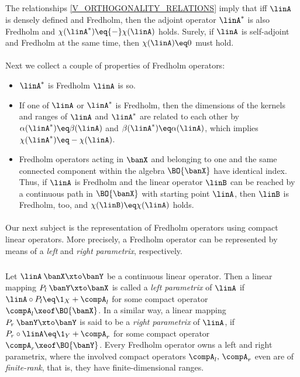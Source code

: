 \documentclass[11pt,twoside]{article}
\begin{document}
\subparagraph{} %
The relationships \eqref{V_ORTHOGONALITY_RELATIONS} imply
that iff $\linA$ is densely defined and Fredholm,
then the adjoint operator $\linA^*$ is also Fredholm and
$\chi(\linA^*) \eq {-} \chi(\linA)$ holds.
Surely,
if $\linA$ is self-adjoint and Fredholm at the same time,
then $\chi(\linA) \eq 0$ must hold.

\paragraph{} %
Next we collect a couple of properties of Fredholm operators:

\begin{itemize}[leftmargin=4mm]
\item[1.]
$\linA^*$ is Fredholm \iff $\linA$ is so.

\item[2.]
If one of $\linA$ or $\linA^*$ is Fredholm,
then the dimensions of the kernels and ranges of $\linA$ and $\linA^*$
are related to each other by
$\alpha(\linA^*) \eq \beta(\linA)$ and
$\beta(\linA^*) \eq \alpha(\linA)$,
which implies $\chi(\linA^*) \eq - \chi(\linA)$.

\item[3.]
Fredholm operators acting in $\banX$ and
belonging to one and the same connected component
within the algebra $\BO{\banX}$ have identical index.
Thus,
if $\linA$ is Fredholm and the linear operator $\linB$ can be reached
by a continuous path in $\BO{\banX}$ with starting point $\linA$,
then $\linB$ is Fredholm,
too,
and $\chi(\linB) \eq \chi(\linA)$ holds.
\end{itemize}

\paragraph{} %
Our next subject is the representation of Fredholm operators
using compact linear operators.
More precisely,
a Fredholm operator can be represented by means of
a \textit{left} and \textit{right parametrix},
respectively.

\subparagraph{}
Let $\linA\:\banX \xto \banY$ be a continuous linear operator.
Then a linear mapping $P_l\:\banY \xto \banX$
is called a \textit{left parametrix} of $\linA$
if $\linA \circ P_l \eq \1_X + \compA_l$
for some compact operator $\compA_l \xeof \BO{\banX}$.
In a similar way,
a linear mapping $P_r\:\banY \xto \banY$
is said to be a \textit{right parametrix} of $\linA$,
if $P_r \circ \linA \eq \1_Y + \compA_r$
for some compact operator $\compA_r \xeof \BO{\banY}$.
Every Fredholm operator owns a left and right parametrix,
where the involved compact operators $\compA_l,\,\compA_r$
even are of \textit{finite-rank},
that is,
they have finite-dimensional ranges.
\end{document}
